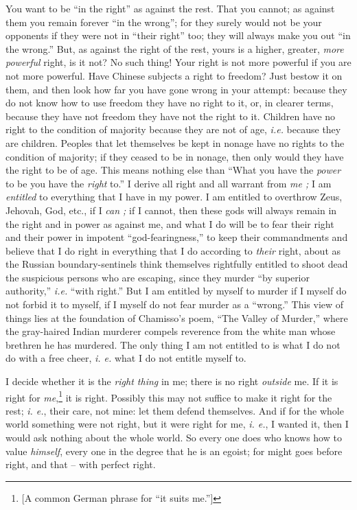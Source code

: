 \documentclass[12pt,a4paper]{book}
\begin{document}
You want to be ``in the right'' as against the rest. That you cannot; as 
against them you remain forever ``in the wrong''; for they surely would not 
be your opponents if they were not in ``their right'' too; they will always 
make you out ``in the wrong.'' But, as against the right of the rest, yours 
is a higher, greater, \textit{more powerful} right, is it not? No such thing! 
Your right is not more powerful if you are not more powerful. Have Chinese 
subjects a right to freedom? Just bestow it on them, and then look how far you 
have gone wrong in your attempt: because they do not know how to use freedom 
they have no right to it, or, in clearer terms, because they have not freedom 
they have not the right to it. Children have no right to the condition of 
majority because they are not of age, \textit{i.e.} because they are children. 
Peoples that let themselves be kept in nonage have no rights to the condition 
of majority; if they ceased to be in nonage, then only would they have the 
right to be of age. This means nothing else than ``What you have the 
\textit{power} to be you have the \textit{right} to.'' I derive all right and 
all warrant from \textit{me ;} I am \textit{entitled} to everything that I 
have in my power. I am entitled to overthrow Zeus, Jehovah, God, etc., if I 
\textit{can ;} if I cannot, then these gods will always remain in the right 
and in power as against me, and what I do will be to fear their right and 
their power in impotent ``god-fearingness,'' to keep their commandments and 
believe that I do right in everything that I do according to \textit{their} 
right, about as the Russian boundary-sentinels think themselves rightfully 
entitled to shoot dead the suspicious persons who are escaping, since they 
murder ``by superior authority,'' \textit{i.e.} ``with right.'' But I am 
entitled by myself to murder if I myself do not forbid it to myself, if I 
myself do not fear murder as a ``wrong.'' This view of things lies at the 
foundation of Chamisso's poem, ``The Valley of Murder,'' where the 
gray-haired Indian murderer compels reverence from the white man whose 
brethren he has murdered. The only thing I am not entitled to is what I do not 
do with a free cheer, \textit{i. e.} what I do not entitle myself to.

I decide whether it is the \textit{right thing} in me; there is no right 
\textit{outside} me. If it is right for \textit{me},\footnote{[A common German 
phrase for ``it suits me.'']} it is right. Possibly this may not suffice to 
make it right for the rest; \textit{i. e.}, their care, not mine: let them 
defend themselves. And if for the whole world something were not right, but it 
were right for me, \textit{i. e.}, I wanted it, then I would ask nothing about 
the whole world. So every one does who knows how to value \textit{himself}, 
every one in the degree that he is an egoist; for might goes before right, and 
that -- with perfect right.
\end{document}
